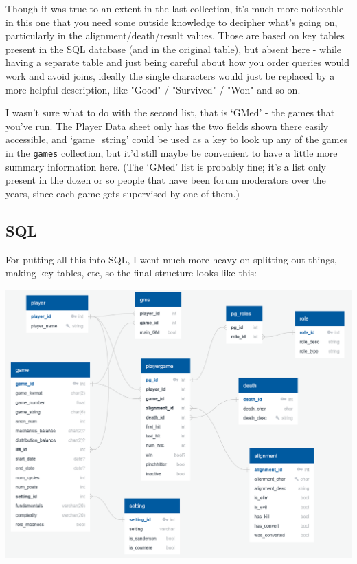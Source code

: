 \documentclass[11pt, oneside]{amsart}   	%
\begin{document}
Though it was true to an extent in the last collection, it's much more noticeable in this one that you need some outside knowledge to decipher what's going on, particularly in the alignment/death/result values. Those are based on key tables present in the SQL database (and in the original table), but absent here - while having a separate table and just being careful about how you order queries would work and avoid joins, ideally the single characters would just be replaced by a more helpful description, like "Good" / "Survived" / "Won" and so on.

I wasn't sure what to do with the second list, that is `GMed' - the games that you've run. The Player Data sheet only has the two fields shown there easily accessible, and `game\_string' could be used as a key to look up any of the games in the \texttt{games} collection, but it'd still maybe be convenient to have a little more summary information here. (The `GMed' list is probably fine; it's a list only present in the dozen or so people that have been forum moderators over the years, since each game gets supervised by one of them.)


\subsection{SQL}

For putting all this into SQL, I went much more heavy on splitting out things, making key tables, etc, so the final structure looks like this: 

\includegraphics[scale=0.5]{../diagrams/se diagram v3.png}
\end{document}
